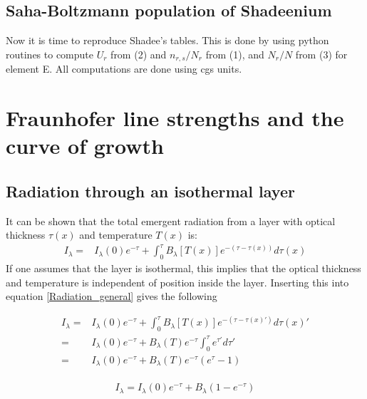 \documentclass{aa}   %
\begin{document}
\subsection{Saha-Boltzmann population of Shadeenium}
Now it is time to reproduce Shadee's tables. This is done by using python routines to compute $U_r$ from (2) and $n_{r,s}/N_r$ from (1), and $N_r/N$ from (3) for element E. All computations are done using cgs units.
\section{Fraunhofer line strengths and the curve of growth}   \label{sec:Fraunhofer}


\subsection{Radiation through an isothermal layer}
It can be shown that the total emergent radiation from a layer with optical thickness $\tau(x)$ and temperature $T(x)$ is:
\begin{equation}\label{Radiation_general}
\begin{aligned}
 I_{\lambda} =& I_{\lambda}(0)e^{-\tau} + \int_0^\tau B_{\lambda}[T(x)]e^{-(\tau - \tau(x))}d\tau(x)
\end{aligned}
\end{equation}
If one assumes that the layer is isothermal, this implies that the optical thickness and temperature is independent of position inside the layer. Inserting this into equation \ref{Radiation_general} gives the following

\begin{equation*}
\begin{aligned}
I_{\lambda} =& I_{\lambda}(0)e^{-\tau} + \int_0^\tau B_{\lambda}[T(x)]e^{-(\tau - \tau(x)')}d\tau(x)'\\
	    =& I_{\lambda}(0)e^{-\tau} + B_{\lambda}(T)e^{-\tau}\int_0^\tau e^{\tau'}d\tau'\\
	    =& I_{\lambda}(0)e^{-\tau} + B_{\lambda}(T)e^{-\tau}(e^{\tau} - 1)\\
\end{aligned}
\end{equation*}

\begin{equation}\label{Radiation_isothermal}
 I_{\lambda} = I_{\lambda}(0)e^{-\tau} + B_{\lambda}(1 - e^{-\tau})
\end{equation}
\end{document}
